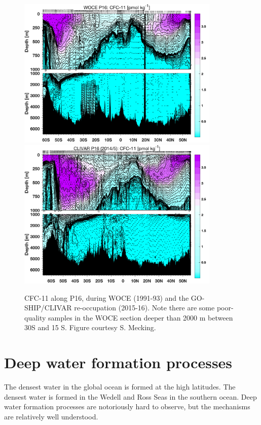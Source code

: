 \begin{figure}[hbt]
  \begin{center}
    \includegraphics[width=3.8in]{figs/WaterMasses/p16_cfc11_woce.png}
    \includegraphics[width=3.8in]{figs/WaterMasses/p16_cfc11_2014_2015.png}
    \caption{CFC-11 along P16, during WOCE (1991-93) and the GO-SHIP/CLIVAR re-occupation (2015-16).  Note there are some poor-quality samples in the WOCE section deeper than 2000 m between 30S and 15 S.  Figure courtesy S. Mecking.}
    \label{fig:P16CFCWOCECLIVAR}  
  \end{center}
\end{figure}


\clearpage

\section{Deep water formation processes}

The densest water in the global ocean is formed at the high latitudes.  The densest water is formed in the Wedell and Ross Seas in the southern ocean.  Deep water formation processes are notoriously hard to observe, but the mechanisms are relatively well understood.  

